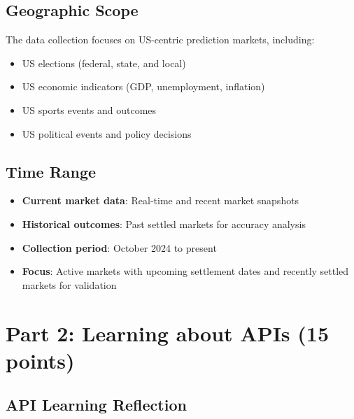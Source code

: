 \documentclass[12pt,a4paper]{article}
\begin{document}
\subsection{Geographic Scope}

The data collection focuses on US-centric prediction markets, including:

\begin{itemize}
  \item US elections (federal, state, and local)
  \item US economic indicators (GDP, unemployment, inflation)
  \item US sports events and outcomes
  \item US political events and policy decisions
\end{itemize}

\subsection{Time Range}

\begin{itemize}
  \item \textbf{Current market data}: Real-time and recent market snapshots
  \item \textbf{Historical outcomes}: Past settled markets for accuracy analysis
  \item \textbf{Collection period}: October 2024 to present
  \item \textbf{Focus}: Active markets with upcoming settlement dates and recently settled markets for validation
\end{itemize}
\section{Part 2: Learning about APIs (15 points)}

\subsection{API Learning Reflection}
\end{document}
